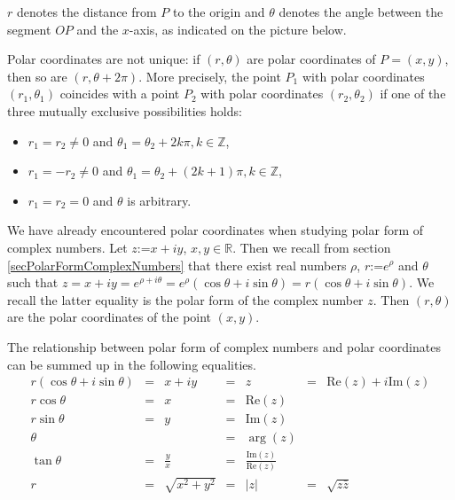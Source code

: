 \documentclass[12pt]{book}
\renewcommand{\Im}{\mathrm{Im}}
\renewcommand{\Re}{\mathrm{Re}}
\newcommand{\eqdef}{\textbf{:=}}
\renewcommand{\optionalDisplay}[1]{}
\begin{document}
$r$ denotes the distance from $P$ to the origin and $\theta$ denotes the angle between the segment $OP$ and the $x$-axis, as indicated on the picture below.

\optionalDisplay{
\psset{xunit=1cm,yunit=1cm}
\begin{pspicture*}(-1.5,-1.5)(5,4)
\psline[linecolor=gray](-1.5,0)(2.5,0) %
\psline[linecolor=gray](0,-1.5)(0,2.5) %
\parametricplot[linecolor=red]{0}{60}{t cos 0.25 mul t 1000 div 1 add mul t sin 0.25 mul t 1000 div 1 add mul}
\parametricplot[linecolor=red, arrows=->]{0}{780}{t cos 0.55 mul t 1000 div 1 add mul t sin 0.55 mul t 1000 div 1 add mul}
\psline(0,0)(2,  3.464)
\rput(2,  3.464){$\bullet$}
\rput[lt](2,  3.264){$P= (r\cos \theta, r\sin \theta)$}
\rput(0.35,  0.25){$\theta$}
\end{pspicture*}
} %

Polar coordinates are not unique: if $(r, \theta)$ are polar coordinates of $P=(x,y)$, then so are $(r, \theta+2\pi)$. More precisely, the point $P_1$ with polar coordinates $(r_1, \theta_1)$ coincides with a point $P_2$ with polar coordinates $(r_2, \theta_2)$ if one of the three mutually exclusive possibilities holds:
\begin{itemize}
\item $r_1=r_2\neq 0$ and $\theta_1=\theta_2+2k\pi, k\in \mathbb Z $,
\item $r_1=-r_2\neq 0$ and $\theta_1=\theta_2+(2k+1)\pi, k\in \mathbb Z$,
\item $r_1=r_2=0 $ and $\theta$ is arbitrary.
\end{itemize}




We have already encountered polar coordinates when studying polar form of complex numbers. Let $z\eqdef x+iy$, $x,y\in \mathbb R$. Then we recall from section \ref{secPolarFormComplexNumbers} that there exist real numbers $\rho$, $r\eqdef e^\rho$ and $\theta$ such that $z=x+iy= e^{\rho+i\theta}= e^\rho(\cos \theta+i\sin \theta)= r(\cos \theta + i\sin \theta)$. We recall the latter equality is the polar form of the complex number $z$. Then $(r, \theta)$ are the polar coordinates of the point $(x,y)$.

The relationship between polar form of complex numbers and polar coordinates can be summed up in the following equalities.
\[
\begin{array}{rclclcl}
r(\cos \theta+i\sin\theta) &=&  x+iy&=& z&=&\Re (z)+i\Im(z)\\
r\cos\theta&=&x&=&\Re(z)\\
r\sin\theta&=&y&=&\Im(z)\\
\theta&&&=& \arg (z)\\
\tan \theta &=&\displaystyle\frac{y}{x}&=&\displaystyle\frac{\Im (z)}{\Re (z)}\\
r&=&\sqrt{x^2+y^2}&=& |z|&=&\sqrt{z\bar z}\\
\end{array}
\]
\end{document}
